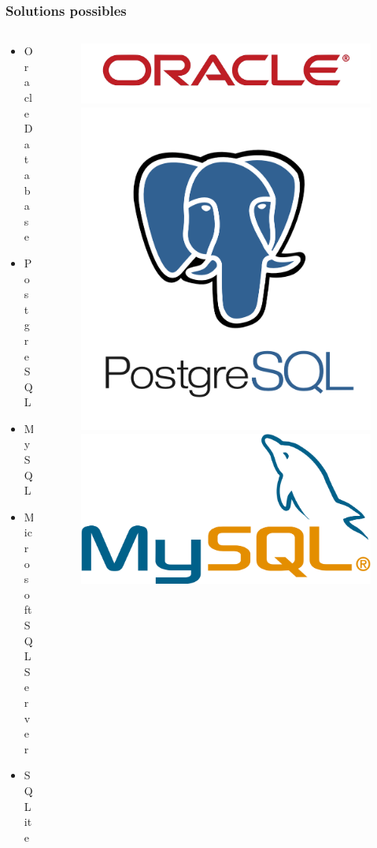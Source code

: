 \begin{frame}
\frametitle{Solutions possibles}
\begin{columns}
\begin{column}{5cm}
\begin{itemize}
	\item Oracle Database
	\item PostgreSQL
	\item MySQL
	\item Microsoft SQL Server
	\item SQLite
\end{itemize}
\end{column}
\begin{column}{7cm}
\begin{figure}
\includegraphics[scale=0.038]{Images/Oracle}
\includegraphics[scale=0.18]{Images/PostgreSQL}\\
\includegraphics[scale=0.04]{Images/MySQL}\\

\end{figure}
\end{column}
\end{columns}
\end{frame}
